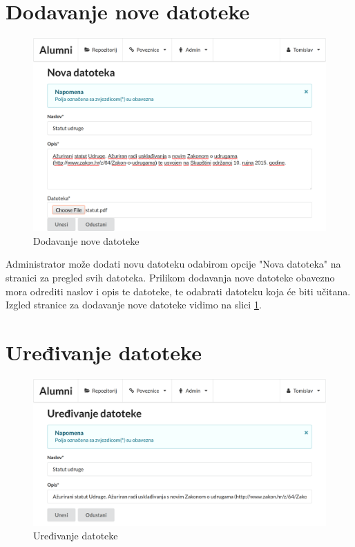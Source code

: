 \documentclass[zavrsni, numeric]{fer}
\begin{document}
\section{Dodavanje nove datoteke}

\begin{figure}[H]
	\centering
	\includegraphics[width=13cm]{slike/nova-datoteka.png}
	\caption{Dodavanje nove datoteke}
	\label{fig:nova-datoteka}
\end{figure}

Administrator može dodati novu datoteku odabirom opcije "Nova datoteka" na stranici za pregled svih datoteka. Prilikom dodavanja nove datoteke obavezno mora odrediti naslov i opis te datoteke, te odabrati datoteku koja će biti učitana. Izgled stranice za dodavanje nove datoteke vidimo na slici \ref{fig:nova-datoteka}.

\section{Uređivanje datoteke}

\begin{figure}[H]
	\centering
	\includegraphics[width=13cm]{slike/uredi-datoteku.png}
	\caption{Uređivanje datoteke}
	\label{fig:uredi-datoteku}
\end{figure}
\end{document}
